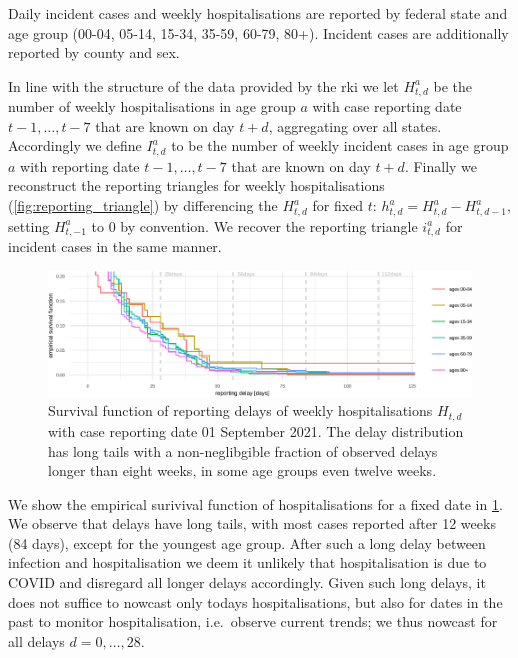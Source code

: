 Daily incident cases and weekly hospitalisations are reported by federal
state and age group (00-04, 05-14, 15-34, 35-59, 60-79, 80+). Incident
cases are additionally reported by county and sex.

In line with the structure of the data provided by the \gls{rki} we let \(H^a_{t,d}\) be the number of weekly hospitalisations
in age group \(a\) with case reporting date \(t - 1, \dots, t - 7\) that
are known on day \(t + d\), aggregating over all states. Accordingly we
define \(I^a_{t,d}\) to be the number of weekly incident cases in age
group \(a\) with reporting date \(t - 1, \dots, t - 7\) that are known
on day \(t + d\). Finally we reconstruct the reporting triangles for
weekly hospitalisations (\cref{fig:reporting_triangle}) by
differencing the \(H^a_{t,d}\) for fixed \(t\):
\(h^a_{t,d} = H^a_{t,d} - H^a_{t, d - 1}\), setting \(H^a_{t, -1}\) to
\(0\) by convention. We recover the reporting triangle \(i^a_{t,d}\) for
incident cases in the same manner.

\begin{figure}

    {\centering \includegraphics[width=\textwidth]{figures_tentative/delay_tails-1.pdf} 

}

\caption{Survival function of reporting delays of weekly hospitalisations $H_{t,d}$ with case reporting date 01 September 2021. The delay distribution has long tails with a non-neglibgible fraction of observed delays longer than eight weeks, in some age groups even twelve weeks.}\label{fig:delay_tails}
\end{figure}

We show the empirical surivival function of hospitalisations for a fixed
date in \cref{fig:delay_tails}. We observe that delays have long
tails, with most cases reported after 12 weeks (84 days), except for the
youngest age group. After such a long delay between infection and
hospitalisation we deem it unlikely that hospitalisation is due to COVID
and disregard all longer delays accordingly. Given such long delays, it
does not suffice to nowcast only todays hospitalisations, but also for
dates in the past to monitor hospitalisation, i.e.~observe current
trends; we thus nowcast for all delays \(d = 0, \dots, 28\).

